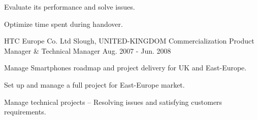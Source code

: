 \begin{cventries}
{\begin{cvitems}
        \item {Evaluate its performance and solve issues.}
        \item {Optimize time spent during handover.}
      \end{cvitems} 
    }
  \cventry
    {HTC Europe Co. Ltd}
    {Slough, UNITED-KINGDOM}
    {Commercialization Product Manager \& Technical Manager}
    {Aug. 2007 - Jun. 2008}
    {
      \begin{cvitems}
        \item {Manage Smartphones roadmap and project delivery for UK and East-Europe.}
        \item {Set up and manage a full project for East-Europe market.}
        \item {Manage technical projects -- Resolving issues and satisfying customers requirements.}
      \end{cvitems}
    }
  
\end{cventries}
